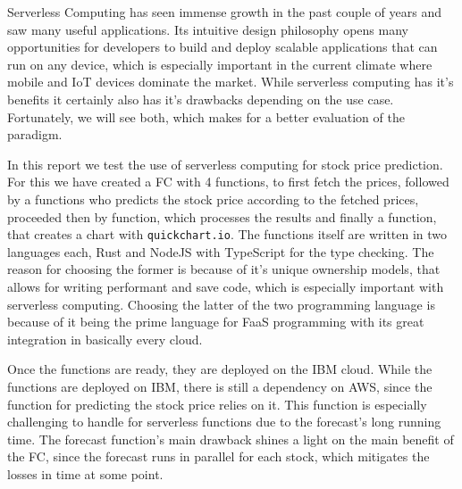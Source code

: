 \noindent

Serverless Computing has seen immense growth in the past couple of years and saw
many useful applications. Its intuitive design philosophy opens many
opportunities for developers to build and deploy scalable applications that can
run on any device, which is especially important in the current climate where
mobile and IoT devices dominate the market. While serverless computing has it's
benefits it certainly also has it's drawbacks depending on the use case.
Fortunately, we will see both, which makes for a better evaluation of the
paradigm.

In this report we test the use of serverless computing for stock price
prediction. For this we have created a FC with 4 functions, to first fetch the
prices, followed by a functions who predicts the stock price according to the
fetched prices, proceeded then by function, which processes the results and
finally a function, that creates a chart with \texttt{quickchart.io}. The functions
itself are written in two languages each, Rust and NodeJS with TypeScript for
the type checking. The reason for choosing the former is because of it's unique
ownership models, that allows for writing performant and save code, which is
especially important with serverless computing. Choosing the latter of the two
programming language is because of it being the prime language for FaaS
programming with its great integration in basically every cloud.

Once the functions are ready, they are deployed on the IBM cloud. While the
functions are deployed on IBM, there is still a dependency on AWS, since the
function for predicting the stock price relies on it. This function is
especially challenging to handle for serverless functions due to the forecast's
long running time. The forecast function's main drawback shines a light on the
main benefit of the FC, since the forecast runs in parallel for each stock,
which mitigates the losses in time at some point.
